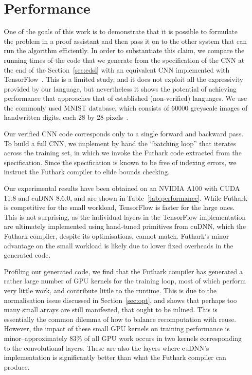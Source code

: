 \section{Performance\label{sec:performance}}

One of the goals of this work is to demonstrate that it is possible to
formulate the problem in a proof assistant and then pass it on to the
other system that can run the algorithm efficiently. In order to
substantiate this claim, we compare the running times of the code that
we generate from the specification of the CNN at the end of the
Section~\ref{sec:edsl} with an equivalent CNN implemented with
TensorFlow~\cite{ad-tf}. This is a limited study, and it does not
exploit all the expressivity provided by our language, but
nevertheless it shows the potential of achieving performance that
approaches that of established (non-verified) languages. We use the
commonly used MNIST database, which consists of 60000 greyscale images
of handwritten digits, each 28 by 28 pixels~\cite{deng2012mnist}.

Our verified CNN code corresponds only to a single forward and
backward pass. To build a full CNN, we implement by hand the
``batching loop'' that iterates across the training set, in which we
invoke the Futhark code extracted from the specification. Since the
specification is known to be free of indexing errors, we instruct the
Futhark compiler to elide bounds checking.

Our experimental results have been obtained on an NVIDIA A100 with
CUDA 11.8 and cuDNN 8.6.0, and are shown in
Table~\ref{tab:performance}. While Futhark is competitive for the
small workload, TensorFlow is faster for the large ones. This is not
surprising, as the individual layers in the TensorFlow implementation
are ultimately implemented using hand-tuned primitives from cuDNN,
which the Futhark compiler, despite its optimisations, cannot match.
Futhark's minor advantage on the small workload is likely due to lower
fixed overheads in the generated code.

Profiling our generated code, we find that the Futhark compiler has
generated a rather large number of GPU kernels for the training loop,
most of which perform very little work, and contribute little to the
runtime. This is due to the normalisation issue discussed in
Section~\ref{sec:opt}, and shows that perhaps too many small arrays
are still manifested, that ought to be inlined. This is essentially
the common dilemma of how to balance recomputation with reuse.
However, the impact of these small GPU kernels on training performance
is minor--approximately 83\% of all GPU work occurs in two kernels
corresponding to the convolutional layers. These are also the layers
where cuDNN's implementation is significantly better than what the
Futhark compiler can produce.

